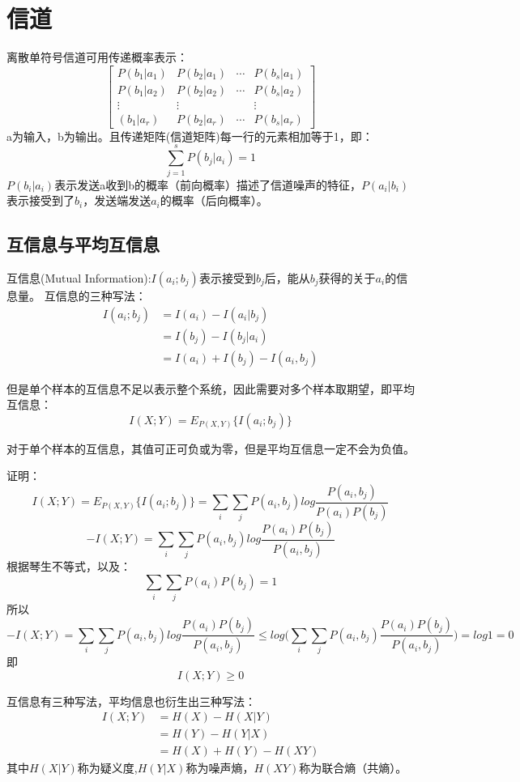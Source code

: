 \documentclass[UTF8]{ctexart} %
\begin{document}
	\section{信道}
		离散单符号信道可用传递概率表示：
			\[ 
			\begin{bmatrix} 
			P(b_1|a_1) &  P(b_2|a_1) & \cdots & P(b_s|a_1)\\
			P(b_1|a_2) &  P(b_2|a_2) & \cdots & P(b_s|a_2)\\
			\vdots & \vdots &   & \vdots\\
			(b_1|a_r) &  P(b_2|a_r) & \cdots & P(b_s|a_r)
			\end{bmatrix} 
			 \]
			 a为输入，b为输出。且传递矩阵(信道矩阵)每一行的元素相加等于1，即：
			 \[\sum_{j=1}^sP(b_j|a_i)=1\]
			 $P(b_i|a_i)$表示发送a收到b的概率（前向概率）描述了信道噪声的特征，$P(a_i|b_i)$表示接受到了$b_i$，发送端发送$a_i$的概率（后向概率）。
		\subsection{互信息与平均互信息}
			互信息(Mutual Information):$I(a_i;b_j)$表示接受到$b_j$后，能从$b_j$获得的关于$a_i$的信息量。
			互信息的三种写法：
			\[\begin{aligned}
				I(a_i;b_j) &= I(a_i) - I(a_i | b_j)\\
				& =I(b_j) - I(b_j | a_i)\\
				&  = I(a_i) + I(b_j) -I(a_i,b_j)
			\end{aligned}\]
			
			但是单个样本的互信息不足以表示整个系统，因此需要对多个样本取期望，即平均互信息：
			\[I(X;Y) = E_{P(X,Y)}\{I(a_i;b_j)\}\]
			
			对于单个样本的互信息，其值可正可负或为零，但是平均互信息一定不会为负值。
			
			证明：
			\[I(X;Y) = E_{P(X,Y)}\{I(a_i;b_j)\} = \sum_i\sum_j P(a_i,b_j)log\frac{P(a_i,b_j)}{P(a_i)P(b_j)}\]
			\[-I(X;Y) = \sum_i\sum_j P(a_i,b_j)log\frac{P(a_i)P(b_j)}{P(a_i,b_j)}\]
			根据琴生不等式，以及：
			\[\sum_i\sum_jP(a_i)P(b_j)=1\]
			所以
			 \[-I(X;Y) = \sum_i\sum_j P(a_i,b_j)log\frac{P(a_i)P(b_j)}{P(a_i,b_j)} \leq log\Big(\sum_i\sum_j P(a_i,b_j)\frac{P(a_i)P(b_j)}{P(a_i,b_j)}\Big)=log1=0\]
			 即
			 \[I(X;Y) \geq0\]
			 
			 互信息有三种写法，平均信息也衍生出三种写法：
				\[\begin{aligned}
				I(X;Y) &= H(X) - H(X|Y)\\
				& =H(Y)-H(Y|X)\\
				&  =H(X)+H(Y)-H(XY)
				\end{aligned}\]
			 其中$H(X|Y)$称为疑义度,$H(Y|X)$称为噪声熵，$H(XY)$称为联合熵（共熵）。
			 
			
	
		
\end{document}
